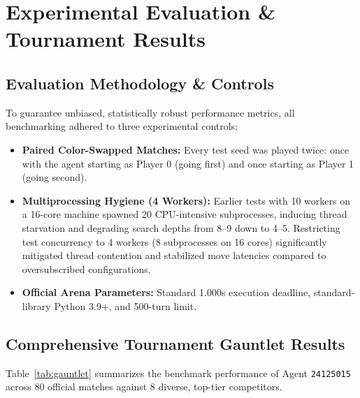 \section{Experimental Evaluation \& Tournament Results}

\subsection{Evaluation Methodology \& Controls}
To guarantee unbiased, statistically robust performance metrics, all benchmarking adhered to three experimental controls:
\begin{itemize}[leftmargin=1.5em]
    \item \textbf{Paired Color-Swapped Matches:} Every test seed was played twice: once with the agent starting as Player 0 (going first) and once starting as Player 1 (going second).
    \item \textbf{Multiprocessing Hygiene (4 Workers):} Earlier tests with 10 workers on a 16-core machine spawned 20 CPU-intensive subprocesses, inducing thread starvation and degrading search depths from 8--9 down to 4--5. Restricting test concurrency to 4 workers (8 subprocesses on 16 cores) significantly mitigated thread contention and stabilized move latencies compared to oversubscribed configurations.
    \item \textbf{Official Arena Parameters:} Standard 1.000s execution deadline, standard-library Python 3.9+, and 500-turn limit.
\end{itemize}

\subsection{Comprehensive Tournament Gauntlet Results}
Table~\ref{tab:gauntlet} summarizes the benchmark performance of Agent \texttt{24125015} across 80 official matches against 8 diverse, top-tier competitors.

